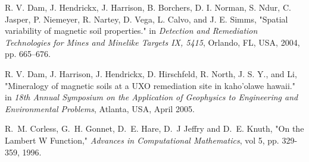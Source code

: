 \documentclass[onecolumn]{IEEEtran} %
\begin{document}
\begin{thebibliography}{100}
R. V. Dam, J. Hendrickx, J. Harrison, B. Borchers, D. I. Norman, S. Ndur, C. Jasper, P. Niemeyer, R. Nartey, D. Vega, L. Calvo, and J. E. Simms, "Spatial variability of magnetic soil properties." in \emph{Detection and Remediation Technologies for Mines and Minelike Targets IX, 5415}, Orlando, FL, USA, 2004, pp. 665–676.

R. V. Dam, J. Harrison, J. Hendrickx, D. Hirschfeld, R. North, J. S. Y., and Li, "Mineralogy of magnetic soils at a UXO remediation site in kaho’olawe hawaii." in \emph{18th Annual Symposium on the Application of Geophysics to Engineering and Environmental Problems}, Atlanta, USA, April 2005. 


R.~M. Corless, G.~H. Gonnet, D.~E. Hare, D.~J Jeffry and D.~E. Knuth, "On the Lambert W Function," \emph{Advances in Computational Mathematics}, vol 5, pp. 329-359, 1996.










\end{thebibliography}











%
%
\end{document}
